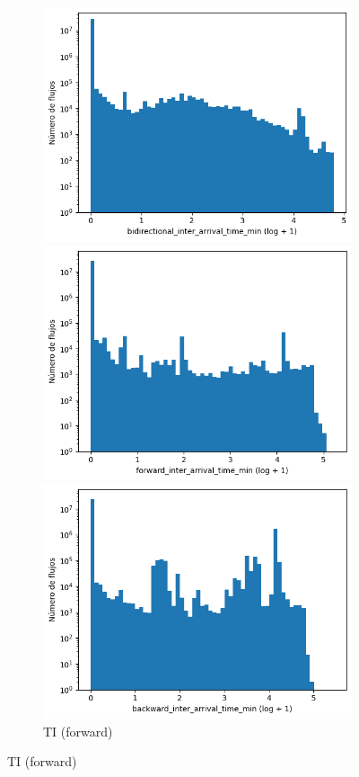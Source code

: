 \begin{figure}[H]
\begin{subfigure}[b]{0.26\textwidth}
        \includegraphics[width=\linewidth]{media/packet_pincer_toniot/bidirectional_inter_arrival_time_min_log_x_log_y.png}
        \caption{TI (bidir.)}
        \includegraphics[width=\textwidth]{media/packet_pincer_toniot/forward_inter_arrival_time_min_log_x_log_y.png}
        \caption{TI (forward)}
        \includegraphics[width=\textwidth]{media/packet_pincer_toniot/backward_inter_arrival_time_min_log_x_log_y.png}

\end{subfigure}
\end{figure}
